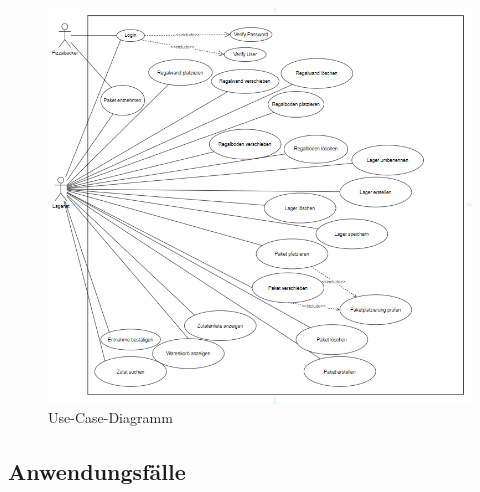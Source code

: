 \begin{figure}[H]
	\centering
	\includegraphics[width=17cm]{Bilder/Kapitel/use-case-diagramm}
	\caption{Use-Case-Diagramm}
	\label{fig:Use-Case-Diagramm}
\end{figure}


\subsection{Anwendungsfälle}


